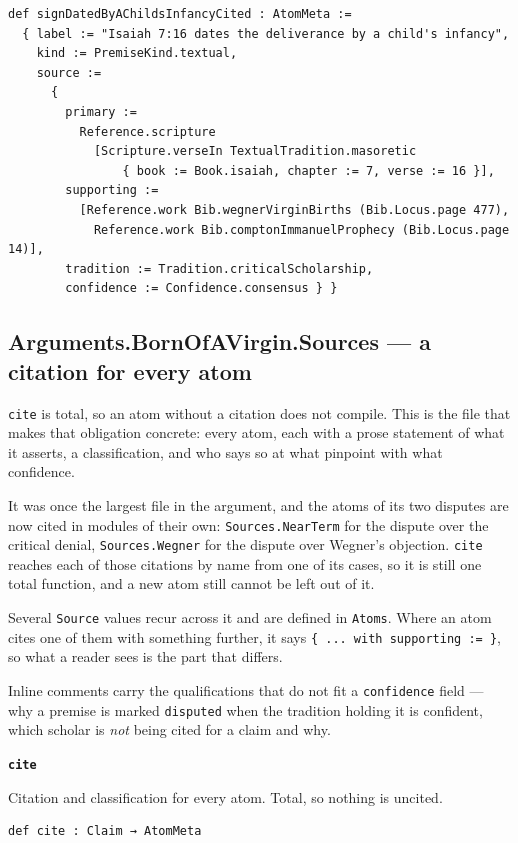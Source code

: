 \documentclass[11pt]{article}
\begin{document}
{\small\begin{verbatim}
def signDatedByAChildsInfancyCited : AtomMeta :=
  { label := "Isaiah 7:16 dates the deliverance by a child's infancy",
    kind := PremiseKind.textual,
    source :=
      {
        primary :=
          Reference.scripture
            [Scripture.verseIn TextualTradition.masoretic
                { book := Book.isaiah, chapter := 7, verse := 16 }],
        supporting :=
          [Reference.work Bib.wegnerVirginBirths (Bib.Locus.page 477),
            Reference.work Bib.comptonImmanuelProphecy (Bib.Locus.page 14)],
        tradition := Tradition.criticalScholarship,
        confidence := Confidence.consensus } }
\end{verbatim}}
\subsection*{Arguments.BornOfAVirgin.Sources — a citation for every atom}
\texttt{cite} is total, so an atom without a citation does not compile. This is the file that makes that obligation concrete: every atom, each with a prose statement of what it asserts, a classification, and who says so at what pinpoint with what confidence.

It was once the largest file in the argument, and the atoms of its two disputes are now cited in modules of their own: \texttt{Sources.Near\allowbreak{}Term} for the dispute over the critical denial, \texttt{Sources.Wegner} for the dispute over Wegner's objection. \texttt{cite} reaches each of those citations by name from one of its cases, so it is still one total function, and a new atom still cannot be left out of it.

Several \texttt{Source} values recur across it and are defined in \texttt{Atoms}. Where an atom cites one of them with something further, it says \texttt{\{ ... with supporting := \}}, so what a reader sees is the part that differs.

Inline comments carry the qualifications that do not fit a \texttt{confidence} field — why a premise is marked \texttt{disputed} when the tradition holding it is confident, which scholar is \emph{not} being cited for a claim and why.

\par\medskip\noindent\textbf{\texttt{cite}}\par\nobreak\noindent
Citation and classification for every atom. Total, so nothing is uncited.

{\small\begin{verbatim}
def cite : Claim → AtomMeta
\end{verbatim}}
\end{document}
